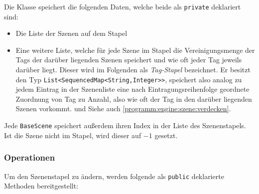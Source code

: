 \begin{sloppypar}
Die Klasse speichert die folgenden Daten, welche beide als \texttt{private}
deklariert sind:

\begin{itemize}
	\item Die Liste der Szenen auf dem Stapel
	\item Eine weitere Liste, welche für jede Szene im Stapel
	      die Vereinigungsmenge der Tags der darüber liegenden
	      Szenen speichert und wie oft jeder Tag jeweils darüber
	      liegt. Dieser wird im Folgenden als \textit{Tag-Stapel}
	      bezeichnet. Er besitzt den Typ \texttt{List<SequencedMap<String,Integer>{>}},
	      speichert also analog zu jedem Eintrag in der Szenenliste
	      eine nach Eintragungsreihenfolge geordnete Zuordnung
	      von Tag zu Anzahl, also wie oft der Tag in den darüber
	      liegenden Szenen vorkommt.
	      und  Siehe auch \ref{programm:engine:szene:verdecken}.
\end{itemize}

Jede \texttt{BaseScene} speichert außerdem ihren Index in der
Liste des Szenenstapels. Ist die Szene nicht im Stapel, wird
dieser auf $-1$ gesetzt.


\subsubsection{Operationen}

Um den Szenenstapel zu ändern, werden folgende als
\texttt{public} deklarierte Methoden bereitgestellt:


\end{sloppypar}
